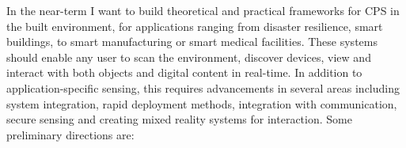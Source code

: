 \documentclass[10pt]{article}
\begin{document}

In the near-term I want to build theoretical and practical frameworks for CPS in the built environment, for applications ranging from disaster resilience, smart buildings, to smart manufacturing or smart medical facilities. These systems should enable any user to scan the environment, discover devices, view and interact with both objects and digital content in real-time. %
In addition to application-specific sensing, this requires advancements in several areas including system integration, rapid deployment methods, integration with communication, secure sensing and creating mixed reality systems for interaction. Some preliminary directions are:

\end{document}
